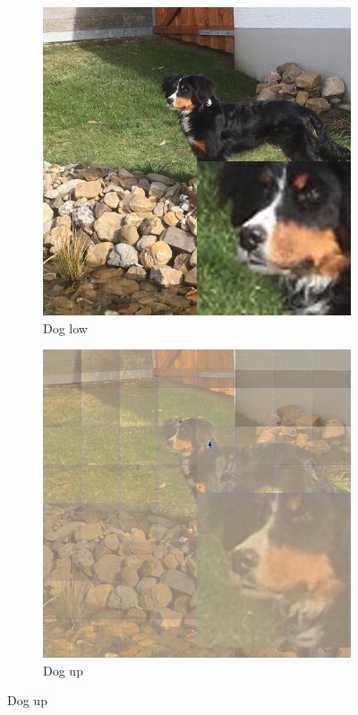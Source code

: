 \documentclass[11pt,twocolumn,twoside,paper=a4]{IEEEtran}
\begin{document}
\centering
\begin{figure}

    \begin{subfigure}{.12\textwidth}
    \centering
    \includegraphics[scale=.5]{../images/dog_low.jpg}  
    \caption{Dog low}
    \label{fig:dog_low}
    \end{subfigure} 
    
    \begin{subfigure}{.12\textwidth}
    \centering 
    \includegraphics[scale=0.125]{../images/dog_up.jpg}  
    \caption{Dog up}
    \label{fig:dog_up}
    \end{subfigure} 




\end{figure}
\end{document}
